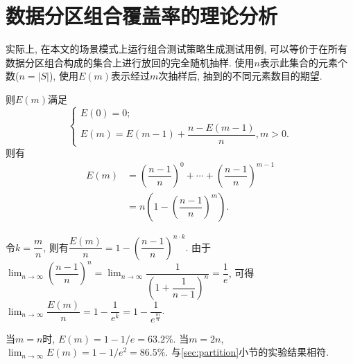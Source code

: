 \chapter{数据分区组合覆盖率的理论分析}
    \label{sec:partition_deduction}
    
    实际上, 在本文的场景模式上运行组合测试策略生成测试用例, 可以等价于在所有数据分区组合构成的集合上进行放回的完全随机抽样. 使用$n$表示此集合的元素个数($n = |S|$), 使用$E(m)$表示经过$m$次抽样后, 抽到的不同元素数目的期望.
    
    则$E(m)$满足
    \begin{equation}
        \left\{
        \begin{array}{l}
             E(0) = 0; \\
             E(m) = E(m-1) + \dfrac{n - E(m-1)}{n}, m > 0.
        \end{array}
        \right.
    \end{equation}
    则有
    \begin{equation}
        \begin{aligned}
        	E(m) & =\left(\dfrac{n-1}{n}\right)^{0} + \cdots + \left(\dfrac{n-1}{n}\right)^{m-1} \\
            & = n\left(1-(\dfrac{n-1}{n})^{m}\right).
    	\end{aligned}
    \end{equation}
    
    令$k = \dfrac{m}{n}$, 则有$\dfrac{E(m)}{n} = 1 - \left(\dfrac{n-1}{n}\right)^{n\cdot k}$. 由于$\lim_{n\to\infty} \left(\dfrac{n-1}{n}\right)^n = \lim_{n\to\infty} \dfrac{1}{\left(1+\dfrac{1}{n-1}\right)^n} = \dfrac{1}{e}$, 可得$\lim_{n\to\infty}\dfrac{E(m)}{n} = 1 - \dfrac{1}{e^{k}} = 1 - \dfrac{1}{e^\frac{m}{n}}$.
    
    当$m=n$时, $E(m) = 1 - 1 / e = 63.2\%$. 当$m=2n$, $\lim_{n\to\infty} E(m) = 1 - 1 / e^2 = 86.5\%$. 与\ref{sec:partition}小节的实验结果相符.